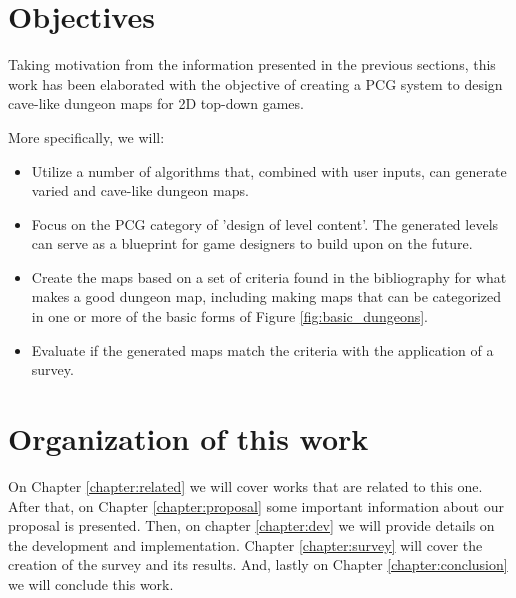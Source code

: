 \section{Objectives}
\label{sec:objectives}

Taking motivation from the information presented in the previous sections, this work has been elaborated with the objective of creating a PCG system to design cave-like dungeon maps for 2D top-down games.

More specifically, we will:

\begin{itemize}
\item \textbf{} Utilize a number of algorithms that, combined with user inputs, can generate varied and cave-like dungeon maps.

\item \textbf{} Focus on the PCG category of 'design of level content'. The generated levels can serve as a blueprint for game designers to build upon on the future.

\item \textbf{} Create the maps based on a set of criteria found in the bibliography for what makes a good dungeon map, including making maps that can be categorized in one or more of the basic forms of Figure \ref{fig:basic_dungeons}.

\item \textbf{} Evaluate if the generated maps match the criteria with the application of a survey.
\end{itemize}

\section{Organization of this work}

On Chapter \ref{chapter:related} we will cover works that are related to this one. After that, on Chapter \ref{chapter:proposal} some important information about our proposal is presented. Then, on chapter \ref{chapter:dev} we will provide details on the development and implementation. Chapter \ref{chapter:survey} will cover the creation of the survey and its results. And, lastly on Chapter \ref{chapter:conclusion} we will conclude this work.

